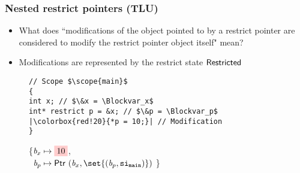 \begin{frame}[fragile]
\frametitle{Nested restrict pointers (TLU)}
\begin{itemize}
    \item What does ``modifications of the object pointed to by a restrict pointer are considered to modify the restrict pointer object itself" mean?
    \item Modifications are represented by the restrict state $\mathsf{Restricted}$
\end{itemize}

\pause

\begin{figure}[h]
\centering
\begin{minipage}{.5\textwidth}
\begin{verbatim}
// Scope $\scope{main}$
{
int x; // $\&x = \Blockvar_x$
int* restrict p = &x; // $\&p = \Blockvar_p$
|\colorbox{red!20}{*p = 10;}| // Modification
}
\end{verbatim}
\end{minipage}%
\begin{minipage}{.5\textwidth}
\executionannotation
{
    \{$\Blockvar_x \mapsto \colorbox{red!20}{10}$, \\
      \ $\Blockvar_p \mapsto \ptr{(\Blockvar_x, \set{(\Blockvar_p, \scope{main})})}$
    \}
}
{
}
\end{minipage}
\end{figure}


\end{frame}

